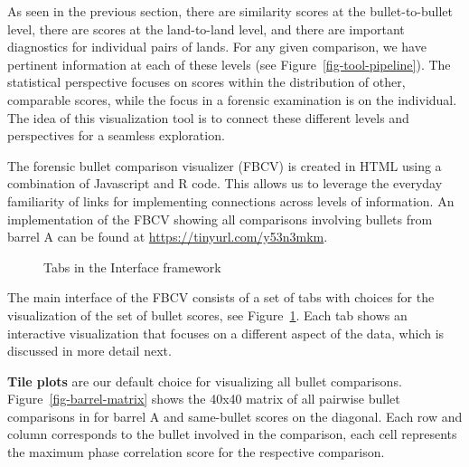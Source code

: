\documentclass[
  12pt]{article}
\begin{document}
As seen in the previous section, there are similarity scores at the
bullet-to-bullet level, there are scores at the land-to-land level, and
there are important diagnostics for individual pairs of lands. For any
given comparison, we have pertinent information at each of these levels
(see Figure~\ref{fig-tool-pipeline}). The statistical perspective
focuses on scores within the distribution of other, comparable scores,
while the focus in a forensic examination is on the individual. The idea
of this visualization tool is to connect these different levels and
perspectives for a seamless exploration.

The forensic bullet comparison visualizer (FBCV) is created in HTML
using a combination of Javascript and R code. This allows us to leverage
the everyday familiarity of links for implementing connections across
levels of information. An implementation of the FBCV showing all
comparisons involving bullets from barrel A can be found at
\url{https://tinyurl.com/y53n3mkm}.

\begin{figure}


\caption{\label{fig-framework-interface}Tabs in the Interface framework}

\end{figure}%

The main interface of the FBCV consists of a set of tabs with choices
for the visualization of the set of bullet scores, see
Figure~\ref{fig-framework-interface}. Each tab shows an interactive
visualization that focuses on a different aspect of the data, which is
discussed in more detail next. \hfill\newline

\textbf{Tile plots} are our default choice for visualizing all bullet
comparisons. Figure~\ref{fig-barrel-matrix} shows the 40x40 matrix of
all pairwise bullet comparisons in for barrel A and same-bullet scores
on the diagonal. Each row and column corresponds to the bullet involved
in the comparison, each cell represents the maximum phase correlation
score for the respective comparison.
\end{document}
